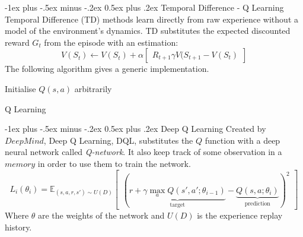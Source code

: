 \documentclass[10pt,landscape]{article}
\makeatletter
\renewcommand{\section}{\@startsection{section}{1}{0mm}%
                                {-1ex plus -.5ex minus -.2ex}%
                                {0.5ex plus .2ex}%
                                {\normalfont\large\bfseries}}
\makeatother
\begin{document}
\begin{multicols}{2}
\section{Temporal Difference - Q Learning}
Temporal Difference (TD) methods learn directly from raw experience without a model of the environment's dynamics. TD substitutes the expected discounted reward $G_t$ from the episode with an estimation:
\begin{equation}
V(S_t) \leftarrow V(S_t) + \alpha \begin{bmatrix}
R_{t + 1} \gamma V(S_{t+1} - V(S_t)	
\end{bmatrix}
\end{equation}
The following algorithm gives a generic implementation.
\begin{algorithm}[H]
 Initialise $Q(s,a)$ arbitrarily \\ 
\caption{Q Learning}
\end{algorithm}  
\section{Deep Q Learning}
Created by $DeepMind$, Deep Q Learning, DQL, substitutes the $Q$ function with a deep neural network called \emph{Q-network}. It also keep track of some observation in a $memory$ in order to use them to train the network. 
\begin{equation}
L_i(\theta_i) = \mathbb{E}_{(s, a, r, s') \sim U(D)}\begin{bmatrix}
	( \underbrace{r + \gamma \max\limits_a Q(s',a'; \theta_{i-1})}_\text{target} - \underbrace{Q(s,a;\theta_i)}_\text{prediction})^2
\end{bmatrix}
\end{equation}
Where $\theta$ are the weights of the network and $U(D)$ is the experience replay history. 


\end{multicols}
\end{document}
